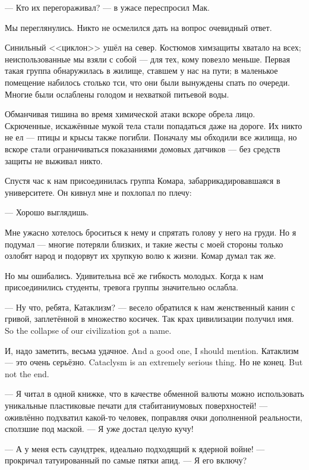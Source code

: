 --- Кто их перегораживал? --- в ужасе переспросил Мак.

Мы переглянулись.
Никто не осмелился дать на вопрос очевидный ответ.

Синильный <<циклон>> ушёл на север.
Костюмов химзащиты хватало на всех;
неиспользованные мы взяли с собой --- для тех, кому повезло меньше.
Первая такая группа обнаружилась в жилище, ставшем у нас на пути;
в маленькое помещение набилось столько тси, что они были вынуждены спать по очереди.
Многие были ослаблены голодом и нехваткой питьевой воды.

Обманчивая тишина во время химической атаки вскоре обрела лицо.
Скрюченные, искажённые мукой тела стали попадаться даже на дороге.
Их никто не ел --- птицы и крысы также погибли.
Поначалу мы обходили все жилища, но вскоре стали ограничиваться показаниями домовых датчиков --- без средств защиты не выживал никто.

Спустя час к нам присоединилась группа Комара, забаррикадировавшаяся в университете.
Он кивнул мне и похлопал по плечу:

--- Хорошо выглядишь.

Мне ужасно хотелось броситься к нему и спрятать голову у него на груди.
Но я подумал --- многие потеряли близких, и такие жесты с моей стороны только озлобят народ и подорвут их хрупкую волю к жизни.
Комар думал так же.

Но мы ошибались.
Удивительна всё же гибкость молодых.
Когда к нам присоединились студенты, тревога группы значительно ослабла.

--- Ну что, ребята, Катаклизм? --- весело обратился к нам женственный канин с гривой, заплетённой в множество косичек.
{Так крах цивилизации получил имя.}
{So the collapse of our civilization got a name.}

{И, надо заметить, весьма удачное.}
{And a good one, I should mention.}
{Катаклизм --- это очень серьёзно.}
{Cataclysm is an extremely serious thing.}
{Но не конец.}
{But not the end.}

--- Я читал в одной книжке, что в качестве обменной валюты можно использовать уникальные пластиковые печати для стабитаниумовых поверхностей! --- оживлённо подхватил какой-то человек, поправляя очки дополненной реальности, сползшие под маской.
--- Я уже достал целую кучу!

--- А у меня есть саундтрек, идеально подходящий к ядерной войне! --- прокричал татуированный по самые пятки апид.
--- Я его включу?

